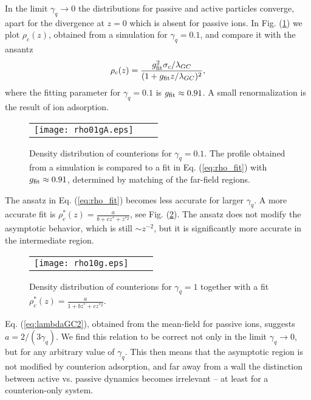 \documentclass[pre,twocolumn,graphicx]{revtex4-1}
\newcommand{\be}{\begin{equation}}
\newcommand{\ee}{\end{equation}}
\begin{document}
In the limit $\gamma_q\to 0$ the distributions for passive and active particles converge, apart for the 
divergence at $z=0$ which is absent for passive ions.  In Fig. (\ref{fig:rhoA1}) we plot $\rho_c(z)$, obtained 
from a simulation for $\gamma_q=0.1$, and compare it with the ansantz 
\be
\rho_c(z) = \frac{g^2_{\rm fit} \sigma_c/\lambda_{GC}}{(1+g_{\rm fit} z/\lambda_{GC} )^2},
\label{eq:rho_fit}
\ee
where the fitting parameter for $\gamma_q=0.1$ is $g_{\rm fit}\approx 0.91$.  A small renormalization  
is the result of ion adsorption.  
\graphicspath{{figures/}}
\begin{figure}[h] 
 \begin{center}
 \begin{tabular}{rrr}
  \texttt{[image: rho01gA.eps]}&&
 \end{tabular}
 \end{center}
\caption{Density distribution of counterions for $\gamma_q=0.1$.  The profile obtained from 
a simulation is compared to a fit in Eq. (\ref{eq:rho_fit}) with $g_{\rm fit}\approx 0.91$, determined 
by matching of the far-field regions.  }
\label{fig:rhoA1}
\end{figure}

The ansatz in Eq. (\ref{eq:rho_fit}) becomes less accurate for larger $\gamma_q$.  
A more accurate fit is $\rho_c^*(z) = \frac{a}{b+ cz^* + z^{*2}}$, see Fig. (\ref{fig:rhoA2}).  The ansatz does not 
modify the asymptotic behavior, which is still $\sim z^{-2}$, but it is significantly more accurate in the intermediate 
region.
\graphicspath{{figures/}}
\begin{figure}[h] 
 \begin{center}
 \begin{tabular}{rrr}
  \texttt{[image: rho10g.eps]}\\
 \end{tabular}
 \end{center}
\caption{Density distribution of counterions for $\gamma_q=1$ together with a fit $\rho_c^*(z) = \frac{a}{1+ bz^* + cz^{*2}}$. } 
\label{fig:rhoA2}
\end{figure}
Eq. (\ref{eq:lambdaGC2}), obtained from the mean-field for passive ions, suggests $a=2/(3\gamma_q)$.  
We find this relation to be correct not only in the limit $\gamma_q\to 0$, but for any arbitrary value of $\gamma_q$.  
This then means that the asymptotic region is not modified by counterion adsorption, and far away from a 
wall the distinction between active vs. passive dynamics becomes irrelevant -- at least for a 
counterion-only system.  
\end{document}
